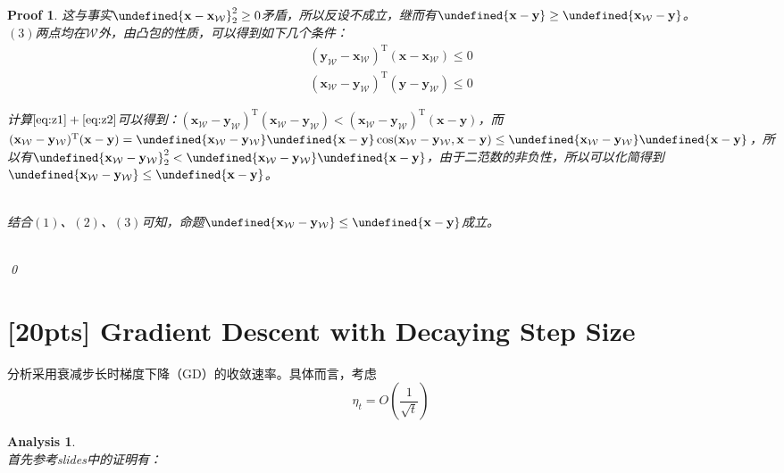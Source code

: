 \documentclass[a4paper,UTF8]{article}
\let\norm\undefined %
\DeclarePairedDelimiter\norm{\lVert}{\rVert}
\numberwithin{equation}{section}
\newtheorem*{myAnalysis}{Analysis}
\newtheorem*{myProof}{Proof}
\begin{document}
\begin{myProof}
这与事实$\norm{\mathbf{x} - \mathbf{x}_\mathcal{W}}_2^2 \ge 0$矛盾，所以反设不成立，继而有$\norm{\mathbf{x} - \mathbf{y}} \ge \norm{\mathbf{x}_\mathcal{W} - \mathbf{y}}$。
~\\
$(3)$两点均在$\mathcal{\mathcal{W}}$外，由凸包的性质，可以得到如下几个条件：
\begin{gather}
(\mathbf{y}_\mathcal{W} - \mathbf{x}_\mathcal{W})^\mathrm{T}(\mathbf{x} - \mathbf{x}_\mathcal{W}) \le 0 \label{eq:z1} \\
(\mathbf{x}_\mathcal{W} - \mathbf{y}_\mathcal{W})^\mathrm{T}(\mathbf{y} - \mathbf{y}_\mathcal{W}) \le 0 \label{eq:z2}
\end{gather}

计算$\ref{eq:z1} + \ref{eq:z2}$可以得到：$(\mathbf{x}_\mathcal{W} - \mathbf{y}_\mathcal{W})^\mathrm{T}(\mathbf{x}_\mathcal{W} - \mathbf{y}_\mathcal{W}) < (\mathbf{x}_\mathcal{W} - \mathbf{y}_\mathcal{W})^\mathrm{T}(\mathbf{x} - \mathbf{y})$，而$(\mathbf{x}_\mathcal{W} - \mathbf{y}_\mathcal{W})^\mathrm{T}(\mathbf{x} - \mathbf{y}) = \norm{\mathbf{x}_\mathcal{W} - \mathbf{y}_\mathcal{W}}\norm{\mathbf{x}-\mathbf{y}} \cos (\mathbf{x}_\mathcal{W} - \mathbf{y}_\mathcal{W}, \mathbf{x} - \mathbf{y}) \le \norm{\mathbf{x}_\mathcal{W} - \mathbf{y}_\mathcal{W}}\norm{\mathbf{x} - \mathbf{y}}$，所以有$\norm{\mathbf{x}_\mathcal{W} - \mathbf{y}_\mathcal{W}}_2^2 < \norm {\mathbf{x}_\mathcal{W} - \mathbf{y}_\mathcal{W}}\norm{\mathbf{x} - \mathbf{y}}$，由于二范数的非负性，所以可以化简得到$\norm{\mathbf{x}_\mathcal{W} - \mathbf{y}_\mathcal{W}} \le \norm{\mathbf{x} - \mathbf{y}}$。

~\\
结合$(1)$、$(2)$、$(3)$可知，命题$\norm{\mathbf{x}_\mathcal{W} - \mathbf{y}_\mathcal{W}} \le \norm{\mathbf{x} - \mathbf{y}}$成立。


~\\

	\qed
\end{myProof}

\newpage
\section{[20pts] Gradient Descent with Decaying Step Size}
\noindent 分析采用衰减步长时梯度下降（GD）的收敛速率。具体而言，考虑
\[
\eta_t=O\left(\frac{1}{\sqrt{t}}\right)
\]

\begin{myAnalysis}~\\
首先参考slides中的证明有：
\begin{eqnarray*}
\end{eqnarray*}
	~\\
	~\\
	~\\
	~\\	
	~\\
\end{myAnalysis}
\end{document}
